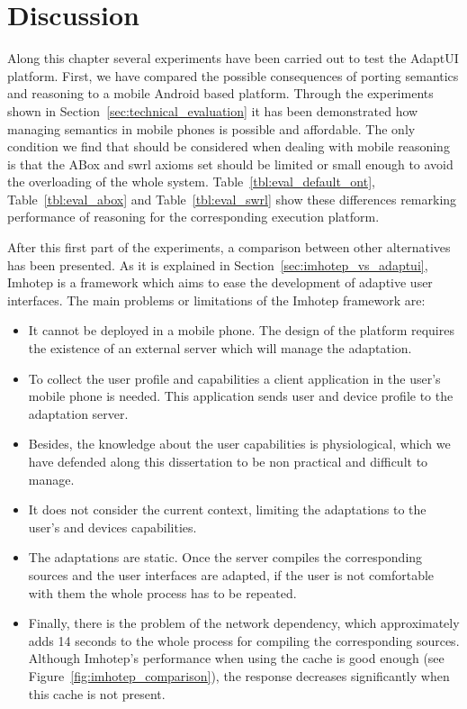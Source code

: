 \section{Discussion}
\label{sec:evaluation_discussion}

Along this chapter several experiments have been carried out to test the AdaptUI
platform. First, we have compared the possible consequences of porting semantics
and reasoning to a mobile Android based platform. Through the experiments shown 
in Section~\ref{sec:technical_evaluation} it has been demonstrated how managing 
semantics in mobile phones is possible and affordable. The only condition we 
find that should be considered when dealing with mobile reasoning is that the 
ABox and \ac{swrl} axioms set should be limited or small enough to avoid the 
overloading of the whole system. Table~\ref{tbl:eval_default_ont},
Table~\ref{tbl:eval_abox} and Table~\ref{tbl:eval_swrl} show these differences 
remarking performance of reasoning for the corresponding execution platform.

After this first part of the experiments, a comparison between other 
alternatives has been presented. As it is explained in 
Section~\ref{sec:imhotep_vs_adaptui}, Imhotep is a framework which aims to ease 
the development of adaptive user interfaces. The main problems or limitations 
of the Imhotep framework are: 

\begin{itemize}
  \item It cannot be deployed in a mobile phone. The design of the platform
  requires the existence of an external server which will manage the adaptation.
  
  \item To collect the user profile and capabilities a client application in
  the user's mobile phone is needed. This application sends user and device
  profile to the adaptation server.
  
  \item Besides, the knowledge about the user capabilities is physiological,
  which we have defended along this dissertation to be non practical and 
difficult
  to manage.
  
  \item It does not consider the current context, limiting the adaptations
  to the user's and devices capabilities.
  
  \item The adaptations are static. Once the server compiles the corresponding
  sources and the user interfaces are adapted, if the user is not comfortable
  with them the whole process has to be repeated.
  
  \item Finally, there is the problem of the network dependency, which 
  approximately adds 14 seconds to the whole process for compiling the 
  corresponding sources. Although Imhotep's performance when using the cache is 
  good enough (see Figure~\ref{fig:imhotep_comparison}), the response decreases 
  significantly  when this cache is not present.
\end{itemize}


